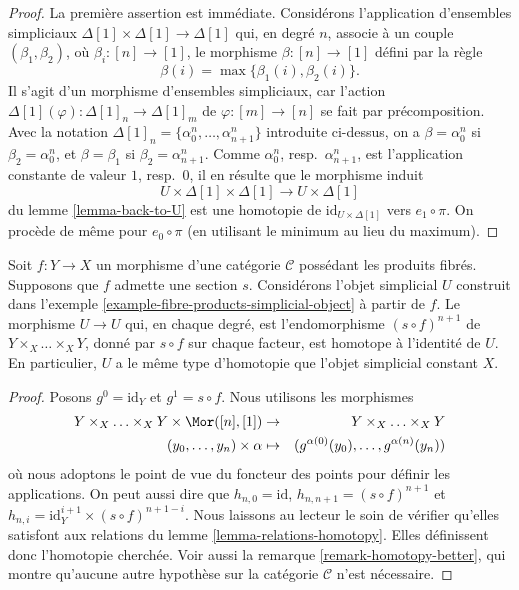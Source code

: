\begin{proof}
La première assertion est immédiate. Considérons l'application d'ensembles simpliciaux
$\Delta[1] \times \Delta[1] \longrightarrow \Delta[1]$
qui, en degré $n$, associe à un couple $(\beta_1, \beta_2)$,
où $\beta_i : [n] \to [1]$, le morphisme
$\beta : [n] \to [1]$ défini par la règle
$$
\beta(i) = \max\{\beta_1(i), \beta_2(i)\}.
$$
Il s'agit d'un morphisme d'ensembles simpliciaux, car l'action
$\Delta[1](\varphi) : \Delta[1]_n \to \Delta[1]_m$
de $\varphi : [m] \to [n]$ se fait par précomposition.
Avec la notation $\Delta[1]_n = \{\alpha^n_0, \ldots, \alpha^n_{n + 1}\}$
introduite ci-dessus, on a $\beta = \alpha^n_0$ si
$\beta_2 = \alpha^n_0$, et $\beta = \beta_1$ si
$\beta_2 = \alpha^n_{n + 1}$.
Comme $\alpha^n_0$, resp.\ $\alpha^n_{n + 1}$, est l'application constante
de valeur $1$, resp.\ $0$, il en résulte que le morphisme induit
$$
U \times \Delta[1] \times \Delta[1]
\longrightarrow
U \times \Delta[1]
$$
du lemme \ref{lemma-back-to-U}
est une homotopie de $\text{id}_{U \times \Delta[1]}$ vers $e_1 \circ \pi$.
On procède de même pour $e_0 \circ \pi$ (en utilisant le minimum au lieu du maximum).
\end{proof}

\begin{lemma}
\label{lemma-fibre-products-simplicial-object-w-section}
Soit $f : Y \to X$ un morphisme d'une catégorie $\mathcal{C}$ possédant les
produits fibrés. Supposons que $f$ admette une section $s$. Considérons
l'objet simplicial $U$ construit dans
l'exemple \ref{example-fibre-products-simplicial-object} à partir de $f$.
Le morphisme $U \to U$ qui, en chaque degré, est l'endomorphisme
$(s \circ f)^{n + 1}$ de $Y \times_X \ldots \times_X Y$, donné par
$s \circ f$ sur chaque facteur, est homotope à l'identité de $U$.
En particulier, $U$ a le même type d'homotopie que l'objet simplicial
constant $X$.
\end{lemma}

\begin{proof}
Posons $g^0 = \text{id}_Y$ et $g^1 = s \circ f$.
Nous utilisons les morphismes
\begin{eqnarray*}
Y \times_X \ldots \times_X Y \times \Mor([n], [1])
& \to &
Y \times_X \ldots \times_X Y \\
(y_0, \ldots, y_n) \times \alpha
& \mapsto &
(g^{\alpha(0)}(y_0), \ldots, g^{\alpha(n)}(y_n))
\end{eqnarray*}
où nous adoptons le point de vue du foncteur des points pour définir les applications.
On peut aussi dire que
$h_{n, 0} = \text{id}$, $h_{n, n + 1} = (s \circ f)^{n + 1}$ et
$h_{n, i} = \text{id}_Y^{i + 1} \times (s \circ f)^{n + 1 - i}$.
Nous laissons au lecteur le soin de vérifier qu'elles satisfont aux relations
du lemme \ref{lemma-relations-homotopy}. Elles définissent donc
l'homotopie cherchée. Voir aussi la remarque \ref{remark-homotopy-better},
qui montre qu'aucune autre hypothèse sur la catégorie $\mathcal{C}$
n'est nécessaire.
\end{proof}

